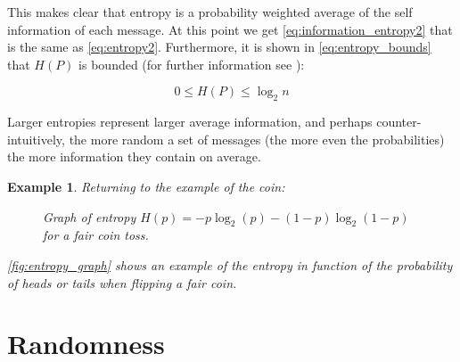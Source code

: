 \documentclass[12pt, a4paper]{report}
\newtheorem{example}{Example} %
\begin{document}
This makes clear that entropy is a probability weighted average of the self information of each message.
At this point we get \autoref{eq:information_entropy2} that is the same as \autoref{eq:entropy2}.
Furthermore, it is shown in \autoref{eq:entropy_bounds} that \(H(P)\) is bounded (for further information see
\cite{AnIntroductionToInformationTheoryAndEntropy}):

\begin{equation} \label{eq:entropy_bounds}
  0 \leq H(P) \leq \log_2 n
\end{equation}

Larger entropies represent larger average information, and perhaps counter-intuitively, the more random a set of messages
(the more even the probabilities) the more information they contain on average.

\begin{example}

Returning to the example of the coin:

\begin{figure}[H]
  \centering
    \caption{\label{fig:entropy_graph} Graph of entropy \( H(p) = -p \log_2(p) - (1-p) \log_2(1-p) \) for a fair coin toss.}
\end{figure}

\autoref{fig:entropy_graph} shows an example of the entropy in function of the probability of heads or tails when flipping a fair
coin.

\end{example}

\chapter{Randomness} \label{chap:randomness}
\end{document}
